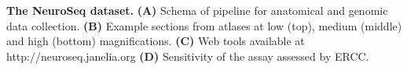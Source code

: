 \textbf{The NeuroSeq dataset.}
\textbf{(A)} Schema of pipeline for anatomical and genomic data collection.
\textbf{(B)} Example sections from atlases at low (top), medium (middle) and high (bottom) magnifications.
\textbf{(C)} Web tools available at http://neuroseq.janelia.org
\textbf{(D)} Sensitivity of the assay assessed by ERCC.

